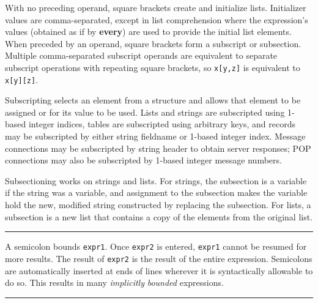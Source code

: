 
\noindent
With no preceding operand, square brackets create and initialize lists.
Initializer values are comma-separated, except in list comprehension
where the expression's values (obtained as if by \textbf{every}) are used
to provide the initial list elements.
When preceded by an operand, square brackets form a subscript or
subsection. Multiple comma-separated subscript operands are equivalent
to separate subscript operations with repeating square brackets, so
\texttt{x[y,z]} is equivalent to \texttt{x[y][z]}.

Subscripting selects an element from a structure and allows that element
to be assigned or for its value to be used. Lists and strings are
subscripted using 1-based integer indices, tables are subscripted using
arbitrary keys, and records may be subscripted by either string
fieldname or 1-based integer index. Message connections may be
subscripted by string header to obtain server responses; POP
connections may also be subscripted by 1-based integer message numbers.

Subsectioning works on strings and lists. For strings, the subsection is
a variable if the string was a variable, and
assignment to the subsection makes the
variable hold the new, modified string constructed by replacing the subsection.
For lists, a subsection is a new
list that contains a copy of the elements from the original list.

\bigskip\hrule\vspace{0.1cm}

\noindent
A semicolon bounds \texttt{expr1}. Once \texttt{expr2} is entered,
\texttt{expr1} cannot be resumed for more results. The result of
\texttt{expr2} is the result of the entire expression. Semicolons are automatically inserted at ends of lines
wherever it is syntactically allowable to do so. This results in many
\textit{implicitly }\textit{bounded}
expressions.

\bigskip\hrule\vspace{0.1cm}


